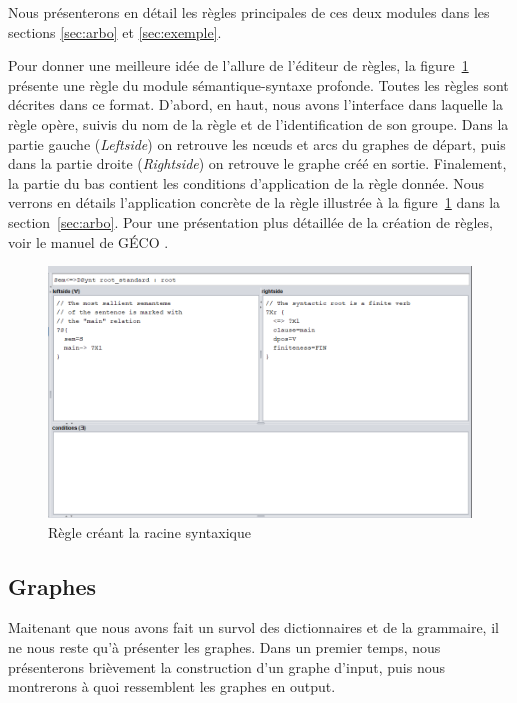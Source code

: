 Nous présenterons en détail les règles principales de ces deux modules dans les sections \ref{sec:arbo} et \ref{sec:exemple}. 

Pour donner une meilleure idée de l'allure de l'éditeur de règles, la figure~\ref{fig:root} présente une règle du module sémantique-syntaxe profonde. Toutes les règles sont décrites dans ce format. D'abord, en haut, nous avons l'interface dans laquelle la règle opère, suivis du nom de la règle et de l'identification de son groupe. Dans la partie gauche (\emph{Leftside}) on retrouve les n\oe{}uds et arcs du graphes de départ, puis dans la partie droite (\emph{Rightside}) on retrouve le graphe créé en sortie. Finalement, la partie du bas contient les conditions d'application de la règle donnée. Nous verrons en détails l'application concrète de la règle illustrée à la figure~\ref{fig:root} dans la section~\ref{sec:arbo}. Pour une présentation plus détaillée de la création de règles, voir le manuel de GÉCO \citep{LambreyGECOv1User2016}.

\begin{figure}[htb]
	\centering
	\includegraphics[width=1\textwidth, trim = {0cm 0cm 0cm 0cm},clip]{ch3/figs/grammaire.png}
	\caption{Règle créant la racine syntaxique}
	\label{fig:root}
\end{figure}


\subsection{Graphes}\label{entree-sortie}

Maitenant que nous avons fait un survol des dictionnaires et de la grammaire, il ne nous reste qu'à présenter les graphes. Dans un premier temps, nous présenterons brièvement la construction d'un graphe d'input, puis nous montrerons à quoi ressemblent les graphes en output.

